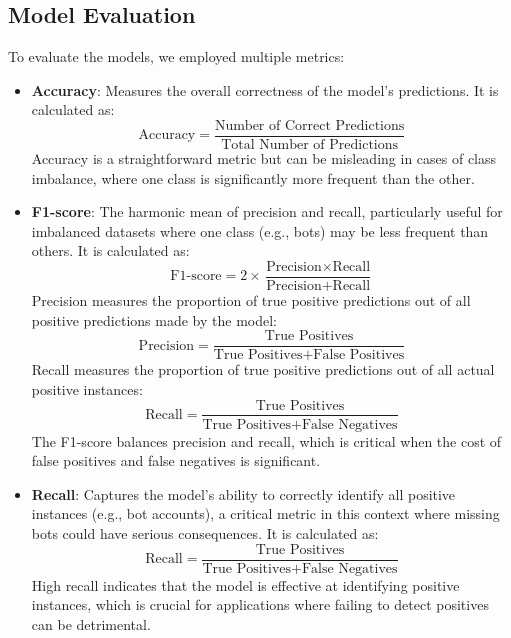 \documentclass[a4paper,11pt]{article}
\begin{document}
\subsection{Model Evaluation}

To evaluate the models, we employed multiple metrics:

\begin{itemize}
    \item \textbf{Accuracy}: Measures the overall correctness of the model's predictions. It is calculated as:
    \[ \text{Accuracy} = \frac{\text{Number of Correct Predictions}}{\text{Total Number of Predictions}} \]
    Accuracy is a straightforward metric but can be misleading in cases of class imbalance, where one class is significantly more frequent than the other.

    \item \textbf{F1-score}: The harmonic mean of precision and recall, particularly useful for imbalanced datasets where one class (e.g., bots) may be less frequent than others. It is calculated as:
    \[ \text{F1-score} = 2 \times \frac{\text{Precision} \times \text{Recall}}{\text{Precision} + \text{Recall}} \]
    Precision measures the proportion of true positive predictions out of all positive predictions made by the model:
    \[ \text{Precision} = \frac{\text{True Positives}}{\text{True Positives} + \text{False Positives}} \]
    Recall measures the proportion of true positive predictions out of all actual positive instances:
    \[ \text{Recall} = \frac{\text{True Positives}}{\text{True Positives} + \text{False Negatives}} \]
    The F1-score balances precision and recall, which is critical when the cost of false positives and false negatives is significant.

    \item \textbf{Recall}: Captures the model's ability to correctly identify all positive instances (e.g., bot accounts), a critical metric in this context where missing bots could have serious consequences. It is calculated as:
    \[ \text{Recall} = \frac{\text{True Positives}}{\text{True Positives} + \text{False Negatives}} \]
    High recall indicates that the model is effective at identifying positive instances, which is crucial for applications where failing to detect positives can be detrimental.


\end{itemize}
\end{document}
